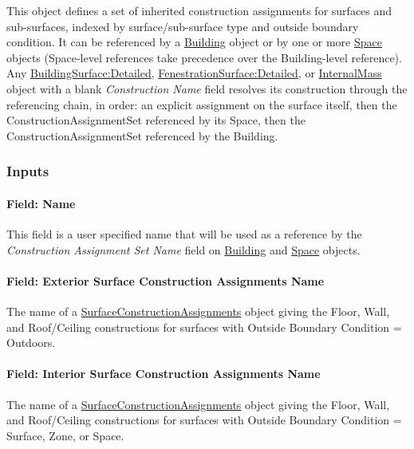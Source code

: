 This object defines a set of inherited construction assignments for surfaces and sub-surfaces, indexed by surface/sub-surface type and outside boundary condition. It can be referenced by a \hyperref[building]{Building} object or by one or more \hyperref[space]{Space} objects (Space-level references take precedence over the Building-level reference). Any \hyperref[buildingsurfacedetailed]{BuildingSurface:Detailed}, \hyperref[fenestrationsurfacedetailed]{FenestrationSurface:Detailed}, or \hyperref[internalmass]{InternalMass} object with a blank \emph{Construction Name} field resolves its construction through the referencing chain, in order: an explicit assignment on the surface itself, then the ConstructionAssignmentSet referenced by its Space, then the ConstructionAssignmentSet referenced by the Building.

\subsubsection{Inputs}\label{constructionassignmentset-inputs}

\paragraph{Field: Name}\label{constructionassignmentset-field-name}

This field is a user specified name that will be used as a reference by the \emph{Construction Assignment Set Name} field on \hyperref[building]{Building} and \hyperref[space]{Space} objects.

\paragraph{Field: Exterior Surface Construction Assignments Name}\label{constructionassignmentset-field-exterior-surface-construction-assignments-name}

The name of a \hyperref[surfaceconstructionassignments]{SurfaceConstructionAssignments} object giving the Floor, Wall, and Roof/Ceiling constructions for surfaces with Outside Boundary Condition = Outdoors.

\paragraph{Field: Interior Surface Construction Assignments Name}\label{constructionassignmentset-field-interior-surface-construction-assignments-name}

The name of a \hyperref[surfaceconstructionassignments]{SurfaceConstructionAssignments} object giving the Floor, Wall, and Roof/Ceiling constructions for surfaces with Outside Boundary Condition = Surface, Zone, or Space.

